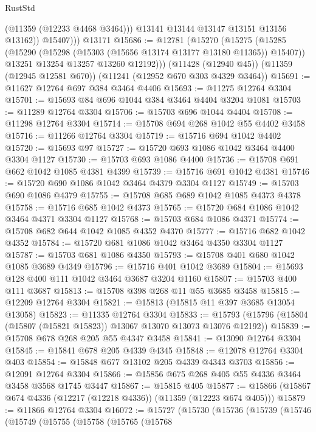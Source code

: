 \begin{lexlean}{RustStd}
\begin{coremodule}
{{{{{{{{{{{{{{{{{{{                (@11359 (@12233 @4468 @3464)))
              @13141
              @13144
              @13147
              @13151
              @13156
              @13162))
          @15407)))
    @13171
@15686 := @12781
    (@15270
      (@15275
        (@15285
          (@15290 (@15298 (@15303 (@15656 @13174 @13177 @13180 @11365)) @15407))
          @13251
          @13254
          @13257
          @13260
          @12192)))
    (@11428 (@12940 @45))
    (@11359 (@12945 @12581 @670))
    (@11241 (@12952 @670 @303 @4329 @3464))
@15691 := @11627 @12764 @697 @384 @3464 @4406
@15693 := @11275 @12764 @3304
@15701 := @15693 @84 @696 @1044 @384 @3464 @4404 @3204 @1081
@15703 := @11289 @12764 @3304
@15706 := @15703 @696 @1044 @4404
@15708 := @11298 @12764 @3304
@15714 := @15708 @694 @268 @1042 @55 @4402 @3458
@15716 := @11266 @12764 @3304
@15719 := @15716 @694 @1042 @4402
@15720 := @15693 @97
@15727 := @15720 @693 @1086 @1042 @3464 @4400 @3304 @1127
@15730 := @15703 @693 @1086 @4400
@15736 := @15708 @691 @662 @1042 @1085 @4381 @4399
@15739 := @15716 @691 @1042 @4381
@15746 := @15720 @690 @1086 @1042 @3464 @4379 @3304 @1127
@15749 := @15703 @690 @1086 @4379
@15755 := @15708 @685 @689 @1042 @1085 @4373 @4378
@15758 := @15716 @685 @1042 @4373
@15765 := @15720 @684 @1086 @1042 @3464 @4371 @3304 @1127
@15768 := @15703 @684 @1086 @4371
@15774 := @15708 @682 @644 @1042 @1085 @4352 @4370
@15777 := @15716 @682 @1042 @4352
@15784 := @15720 @681 @1086 @1042 @3464 @4350 @3304 @1127
@15787 := @15703 @681 @1086 @4350
@15793 := @15708 @401 @680 @1042 @1085 @3689 @4349
@15796 := @15716 @401 @1042 @3689
@15804 := @15693 @128 @400 @111 @1042 @3464 @3687 @3204 @1160
@15807 := @15703 @400 @111 @3687
@15813 := @15708 @398 @268 @11 @55 @3685 @3458
@15815 := @12209 @12764 @3304
@15821 := @15813 (@15815 @11 @397 @3685 @13054 @13058)
@15823 := @11335 @12764 @3304
@15833 := @15793 (@15796 (@15804 (@15807 (@15821 @15823)) @13067 @13070 @13073 @13076 @12192))
@15839 := @15708 @678 @268 @205 @55 @4347 @3458
@15841 := @13090 @12764 @3304
@15845 := @15841 @678 @205 @4339 @4345
@15848 := @12078 @12764 @3304 @403
@15854 := @15848 @677 @13102 @205 @4339 @4343 @3703
@15856 := @12091 @12764 @3304
@15866 := @15856 @675 @268 @405 @55 @4336 @3464 @3458 @3568 @1745 @3447
@15867 := @15815 @405
@15877 := @15866 (@15867 @674 @4336 (@12217 (@12218 @4336)) (@11359 (@12223 @674 @405)))
@15879 := @11866 @12764 @3304
@16072 := @15727
    (@15730
      (@15736
        (@15739
          (@15746
            (@15749
              (@15755
                (@15758
                  (@15765
                    (@15768
}}}}}}}}}}}}}}}}}}}
\end{coremodule}
\end{lexlean}
